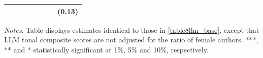 \begin{table}[H]
\begin{threeparttable}
\begin{tabular}{p{3cm}S[table-format=3.3]@{}S[table-format=3.3]@{}S[table-format=3.2]@{}S[table-format=4.3]@{}S[table-format=3.3]@{}S[table-format=3.1]@{}S@{}}
                                          &            &            &            &            &            &            &      (0.13)   \\
            \bottomrule
        \end{tabular}
        \begin{tablenotes}
            \tiny
            \item \textit{Notes}. Table displays estimates identical to those in \autoref{table8llm_base}, except that LLM tonal composite scores are not adjusted for the ratio of female authors. ***, ** and * statistically significant at 1\%, 5\% and 10\%, respectively.
        \end{tablenotes}
    \end{threeparttable}
\end{table}